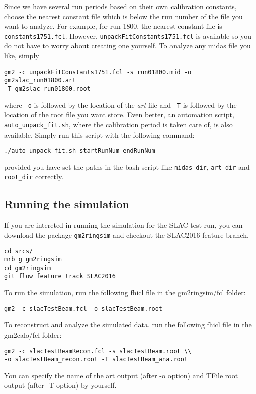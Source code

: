 Since we have several run periods based on their own calibration constants,
choose the nearest constant file which is below the run number of the file you want to analyze. For example, for run 1800, the nearest
constant file is \verb+constants1751.fcl+. However, \verb+unpackFitConstants1751.fcl+ is available so you do not have to worry about creating one yourself.
To analyze any midas file you like, simply
%
\begin{Verbatim}[frame=single]
gm2 -c unpackFitConstants1751.fcl -s run01800.mid -o gm2slac_run01800.art
-T gm2slac_run01800.root
\end{Verbatim}
%
where \verb+-o+ is followed by the location of the \textit{art} file and \verb+-T+ is followed by the location of the root file you want store.
Even better, an automation script, \verb+auto_unpack_fit.sh+, where the calibration period is taken care of, is also available. Simply run this script with the
following command:
%
\begin{Verbatim}
./auto_unpack_fit.sh startRunNum endRunNum
\end{Verbatim}
%
provided you have set the paths in the bash script like \verb+midas_dir+, \verb+art_dir+ and \verb+root_dir+ correctly.

\subsection{Running the simulation}

If you are intereted in running the simulation for the SLAC test run, you can download the package \verb+gm2ringsim+ and checkout the SLAC2016 feature branch.
\begin{Verbatim}[frame=single]
cd srcs/
mrb g gm2ringsim
cd gm2ringsim
git flow feature track SLAC2016
\end{Verbatim}

To run the simulation, run the following fhicl file in the gm2ringsim/fcl folder:
\begin{Verbatim}[frame=single]
gm2 -c slacTestBeam.fcl -o slacTestBeam.root
\end{Verbatim}

To reconstruct and analyze the simulated data, run the following fhicl file in the gm2calo/fcl folder:
\begin{Verbatim}[frame=single]
gm2 -c slacTestBeamRecon.fcl -s slacTestBeam.root \\
-o slacTestBeam_recon.root -T slacTestBeam_ana.root
\end{Verbatim}
%
You can specify the name of the art output (after -o option) and TFile root output (after -T option) by yourself.
